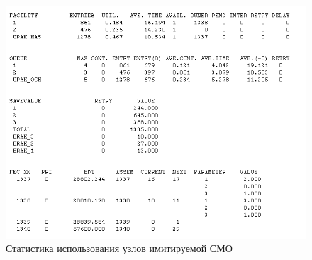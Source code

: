 \begin{figure}[h!]
  \centering
  \includegraphics[width=0.9\linewidth]{pic/report_3}
  \caption{Статистика использования узлов имитируемой СМО}
  \label{pic:report_3}
\end{figure}

\newpage

